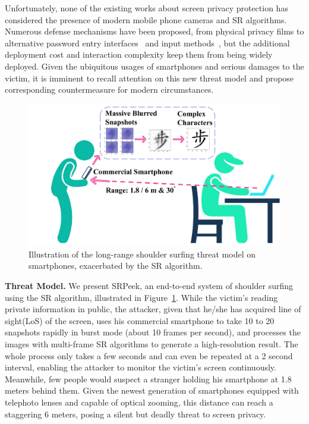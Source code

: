 Unfortunately, none of the existing works about screen privacy protection has considered the presence of modern mobile phone cameras and SR algorithms. Numerous defense mechanisms have been proposed, from physical privacy films to alternative password entry interfaces~\cite{wiedenbeck2006design,papadopoulos2017illusionpin} and input methods~\cite{kumar2007reducing}, but the additional deployment cost and interaction complexity keep them from being widely deployed\cite{Chun2019Keep}. Given the ubiquitous usages of smartphones and serious damages to the victim, it is imminent to recall attention on this new threat model and propose corresponding countermeasure for modern circumstances.

\begin{figure}
	\centering
	\includegraphics[width=0.80\linewidth]{pic/illustration.pdf}
    \caption{Illustration of the long-range shoulder surfing threat model on smartphones, exacerbated by the SR algorithm.}
	\label{overview}
\end{figure}

\vspace{1mm}
\noindent
\textbf{Threat Model.} We present \textsf{SRPeek}, an end-to-end system of shoulder surfing using the SR algorithm, illustrated in Figure~\ref{overview}. 
While the victim's reading private information in public, the attacker, given that he/she has acquired line of sight(LoS) of the screen, uses his commercial smartphone to take 10 to 20 snapshots rapidly in burst mode (about 10 frames per second), and processes the images with multi-frame SR algorithms to generate a high-resolution result. The whole process only takes a few seconds and can even be repeated at a 2 second interval, enabling the attacker to monitor the victim's screen continuously. Meanwhile, few people would suspect a stranger holding his smartphone at 1.8 meters behind them. Given the newest generation of smartphones equipped with telephoto lenses and capable of optical zooming, this distance can reach a staggering 6 meters, posing a silent but deadly threat to screen privacy.

